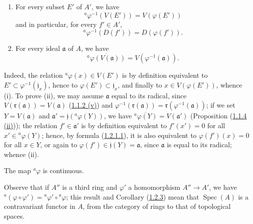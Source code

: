 \begin{proposition}[1.2.2]
\label{I.1.2.2}
\begin{enumerate}
  \item[\rm(i)] For every subset $E'$ of $A'$, we have
  \begin{equation}
    {}^a\varphi^{-1}(V(E'))=V(\varphi(E'))
    \tag{1.2.2.1}\label{I.1.2.2.1}
  \end{equation}
  and in particular, for every $f'\in A'$,
  \begin{equation}
    {}^a\varphi^{-1}(D(f'))=D(\varphi(f')).
    \tag{1.2.2.2}\label{I.1.2.2.2}
  \end{equation}
  \item[\rm(ii)] For every ideal $\mathfrak{a}$ of $A$, we have
  \begin{equation}
    \overline{{}^a\varphi(V(\mathfrak{a}))}
    =V(\varphi^{-1}(\mathfrak{a})).
    \tag{1.2.2.3}\label{I.1.2.2.3}
  \end{equation}
\end{enumerate}
\end{proposition}

Indeed, the relation ${}^a\varphi(x)\in V(E')$ is by definition
equivalent to $E'\subset\varphi^{-1}(\mathfrak{j}_x)$, hence to
$\varphi(E')\subset\mathfrak{j}_x$, and finally to
$x\in V(\varphi(E'))$, whence (i). To prove (ii), we may assume
$\mathfrak{a}$ equal to its radical, since
$V(\mathfrak{r}(\mathfrak{a}))=V(\mathfrak{a})$
(\hyperref[I.1.1.2]{1.1.2 (v)}) and
$\varphi^{-1}(\mathfrak{r}(\mathfrak{a}))
=\mathfrak{r}(\varphi^{-1}(\mathfrak{a}))$; if we set
$Y=V(\mathfrak{a})$ and
$\mathfrak{a}'=\mathfrak{j}({}^a\varphi(Y))$, we have
$\overline{{}^a\varphi(Y)}=V(\mathfrak{a}')$ (Proposition
(\hyperref[I.1.1.4]{1.1.4 (ii)})); the relation
$f'\in\mathfrak{a}'$ is by definition equivalent to $f'(x')=0$ for all
$x'\in{}^a\varphi(Y)$; hence, by formula
(\hyperref[I.1.2.1.1]{1.2.1.1}), it is also equivalent to
$\varphi(f')(x)=0$ for all $x\in Y$, or again to
$\varphi(f')\in\mathfrak{j}(Y)=\mathfrak{a}$, since $\mathfrak{a}$ is
equal to its radical; whence (ii).

\begin{corollary}[1.2.3]
\label{I.1.2.3}
The map ${}^a\varphi$ is continuous.
\end{corollary}

Observe that if $A''$ is a third ring and $\varphi'$ a homomorphism
$A''\to A'$, we have
${}^a(\varphi\circ\varphi')={}^a\varphi'\circ{}^a\varphi$; this result and
Corollary (\hyperref[I.1.2.3]{1.2.3}) mean that
$\operatorname{Spec}(A)$ is a contravariant functor in $A$, from the
category of rings to that of topological spaces.

